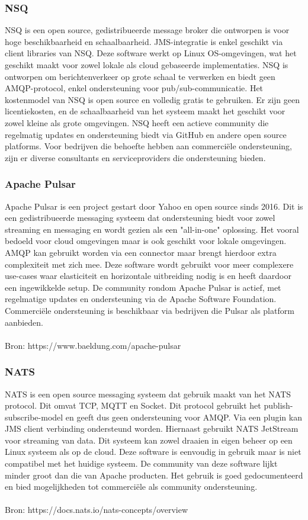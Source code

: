 \subsubsection{NSQ}
NSQ is een open source, gedistribueerde message broker die ontworpen is voor hoge beschikbaarheid en schaalbaarheid. 
JMS-integratie is enkel geschikt via client libraries van NSQ.
Deze software werkt op Linux OS-omgevingen, wat het geschikt maakt voor zowel lokale als cloud gebaseerde implementaties.
NSQ is ontworpen om berichtenverkeer op grote schaal te verwerken en biedt geen AMQP-protocol, enkel ondersteuning voor pub/sub-communicatie. 
Het kostenmodel van NSQ is open source en volledig gratis te gebruiken. 
Er zijn geen licentiekosten, en de schaalbaarheid van het systeem maakt het geschikt voor zowel kleine als grote omgevingen.
NSQ heeft een actieve community die regelmatig updates en ondersteuning biedt via GitHub en andere open source platforms. 
Voor bedrijven die behoefte hebben aan commerciële ondersteuning, zijn er diverse consultants en serviceproviders die ondersteuning bieden.

\subsubsection{Apache Pulsar}
Apache Pulsar is een project gestart door Yahoo en open source sinds 2016.
Dit is een gedistribueerde messaging systeem dat ondersteuning biedt voor zowel streaming en messaging en wordt gezien als een "all-in-one" oplossing.
Het vooral bedoeld voor cloud omgevingen maar is ook geschikt voor lokale omgevingen.
AMQP kan gebruikt worden via een connector maar brengt hierdoor extra complexiteit met zich mee.
Deze software wordt gebruikt voor meer complexere use-cases waar elasticiteit en horizontale uitbreiding nodig is
en heeft daardoor een ingewikkelde setup.
De community rondom Apache Pulsar is actief, met regelmatige updates en ondersteuning via de Apache Software Foundation. 
Commerciële ondersteuning is beschikbaar via bedrijven die Pulsar als platform aanbieden.
\\\\
Bron: https://www.baeldung.com/apache-pulsar

\subsubsection{NATS}
NATS is een open source messaging systeem dat gebruik maakt van het NATS protocol. Dit omvat TCP, MQTT en Socket.
Dit protocol gebruikt het publish-subscribe-model en geeft dus geen ondersteuning voor AMQP.
Via een plugin kan JMS client verbinding ondersteund worden.
Hiernaast gebruikt NATS JetStream voor streaming van data.
Dit systeem kan zowel draaien in eigen beheer op een Linux systeem als op de cloud.
Deze software is eenvoudig in gebruik maar is niet compatibel met het huidige systeem.
De community van deze software lijkt minder groot dan die van Apache producten.
Het gebruik is goed gedocumenteerd en bied mogelijkheden tot commerciële als community ondersteuning.
\\\\
Bron: https://docs.nats.io/nats-concepts/overview

